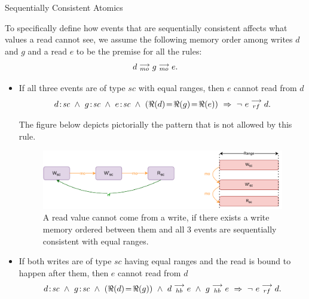         \begin{axiom}{Sequentially Consistent Atomics}
            \label{SeqCsAt}   
            
            To specifically define how events that are sequentially consistent affects what values a read cannot see, we assume the following memory order among writes $d$ and $g$ and a read $e$ to be the premise for all the rules:  
                \begin{align*}
                    d \stackrel{\longrightarrow}{_{mo}} g \stackrel{\longrightarrow}{_{mo}} e.
                \end{align*}
               
            \begin{itemize}
                \item If all three events are of type $sc$ with equal ranges, then $e$ cannot read from $d$
                    \begin{align*}
                        \et{d}{sc}\ \wedge\ \et{g}{sc}\ \wedge\ \et{e}{sc} 
                        \ \wedge \ (\Re(d) \!=\! \Re(g) \!=\! \Re(e))
                        \ \Rightarrow{} \ 
                        \neg \ \reln{e}{rf}{d}.
                    \end{align*} 
                        
                    The figure below depicts pictorially the pattern that is not allowed by this rule.
                    \begin{figure}[H]
                        \centering 
                        \includegraphics[scale=0.7]{4.ECMAScriptMemoryModel/SequentialAtomics1.pdf}
                        \caption{A read value cannot come from a write, if there exists a write memory ordered between them and all  3 events are sequentially consistent with equal ranges.}
                    \end{figure}
                    
                \item If both writes are of type $sc$ having equal ranges and the read is bound to happen after them, then $e$ cannot read from $d$ 
                    \begin{align*}
                        d\!:\!\textit{sc}\ \wedge\ g\!:\!\textit{sc}  
                        \ \wedge \ (\Re(d) \!=\! \Re(g)) 
                        \ \wedge \ d\stackrel{\longrightarrow}{_{hb}}e
                        \ \wedge \ g\stackrel{\longrightarrow}{_{hb}}e
                        \ \Rightarrow{}\  
                        \neg \ e\stackrel{\longrightarrow}{_{rf}}d.
                    \end{align*}
                        

\end{itemize}
\end{axiom}
